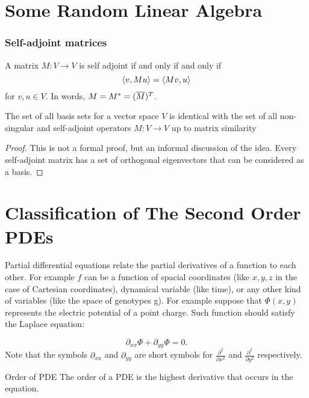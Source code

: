 \section{Some Random Linear Algebra}

\subsubsection{Self-adjoint matrices}
\begin{definition}
	A matrix $M: V \to V$ is self adjoint if and only if and only if
	\[ \langle v, Mu \rangle = \langle Mv, u \rangle \]
	for $v,u \in V$. In words, $M = M^* = (\overline{M})^T$.
\end{definition}

\begin{proposition}
	The set of all basis sets for a vector space $V$ is identical with the set of all non-singular and self-adjoint operators $M: V\to V$ up to matrix similarity
\end{proposition}
\begin{proof}
	This is not a formal proof, but an informal discussion of the idea. Every self-adjoint matrix has a set of orthogonal eigenvectors that can be considered as a basis. 
\end{proof}




\section{Classification of The Second Order PDEs }

Partial differential equations relate the partial derivatives of a function to each other. For example $f$ can be a function of spacial coordinates (like $x,y,z$ in the case of Cartesian coordinates), dynamical variable (like time), or any other kind of variables (like the space of genotypes g). For example suppose that $ \Phi(x,y) $ represents the electric potential of a point charge. Such function should satisfy the Laplace equation:

\[	 \partial_{xx} \Phi + \partial_{yy} \Phi = 0.	\]
Note that the symbols $ \partial_{xx} $ and $ \partial_{yy} $ are short symbols for $ \frac{\partial^2}{\partial x^2} $ and $ \frac{\partial^2}{\partial y^2} $ respectively.

\begin{definition}{Order of PDE}
	The order of a PDE is the highest derivative that occurs in the equation. 
\end{definition}

